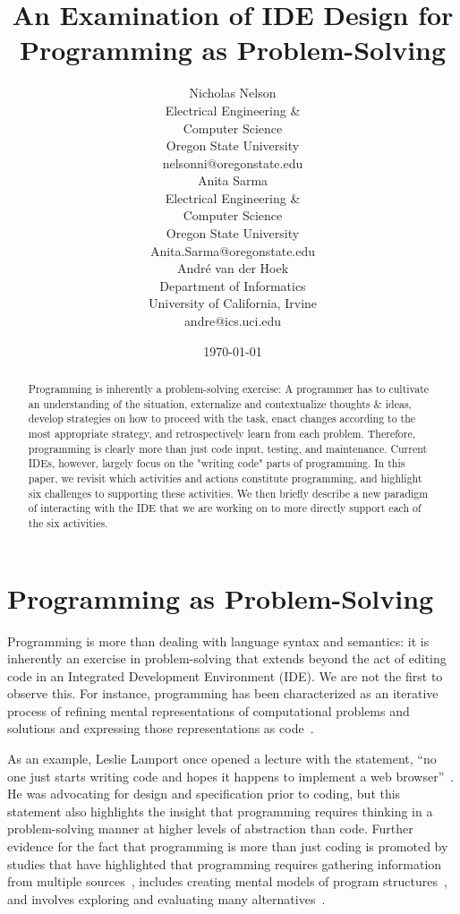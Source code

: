 \documentclass{ppig}
\title{An Examination of IDE Design for Programming as Problem-Solving}
\author{Nicholas Nelson \\
  Electrical Engineering \&\\ Computer Science \\
  Oregon State University \\
  nelsonni@oregonstate.edu \\
  \And
  Anita Sarma \\
  Electrical Engineering \&\\ Computer Science \\
  Oregon State University \\
  Anita.Sarma@oregonstate.edu \\
  \And
  André van der Hoek \\
  Department of Informatics \\
  University of California, Irvine \\
  andre@ics.uci.edu
}
\date{\today}
\begin{document}
\maketitle
\thispagestyle{empty}

\begin{abstract}

Programming is inherently a problem-solving exercise: A programmer has to cultivate an understanding of the situation, externalize and contextualize thoughts \& ideas, develop strategies on how to proceed with the task, enact changes according to the most appropriate strategy, and retrospectively learn from each problem.
Therefore, programming is clearly more than just code input, testing, and maintenance.
Current IDEs, however, largely focus on the "writing code" parts of programming.
In this paper, we revisit which activities and actions constitute programming, and highlight six challenges to supporting these activities.
We then briefly describe a new paradigm of interacting with the IDE that we are working on to more directly support each of the six activities. 
\end{abstract}

\section{Programming as Problem-Solving}

Programming is more than dealing with language syntax and semantics: it is inherently an exercise in problem-solving that extends beyond the act of editing code in an Integrated Development Environment (IDE).
We are not the first to observe this.
For instance, programming has been characterized as an iterative process of refining mental representations of computational problems and solutions and expressing those representations as code~\cite{loksa2016programming}.

As an example, Leslie Lamport once opened a lecture with the statement, ``no one just starts writing code and hopes it happens to implement a web browser''~\cite{lamport2015lecture}.
He was advocating for design and specification prior to coding, but this statement also highlights the insight that programming requires thinking in a problem-solving manner at higher levels of abstraction than code.
Further evidence for the fact that programming is more than just coding is promoted by studies that have highlighted that programming requires gathering information from multiple sources~\cite{sillito2008asking}, includes creating mental models of program structures~\cite{von1995comprehension}, and involves exploring and evaluating many alternatives~\cite{hartmann2008design}.
\end{document}
